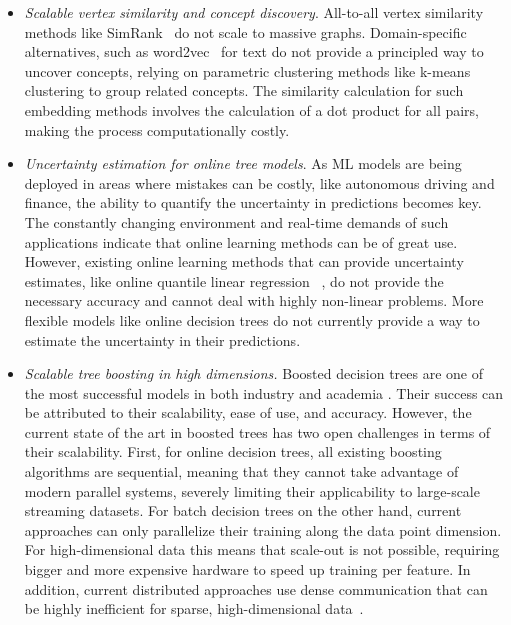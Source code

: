 \begin{itemize}
	\item \emph{Scalable vertex similarity and concept discovery}. All-to-all vertex similarity
	methods like SimRank~\cite{simrank} do not scale to massive graphs. Domain-specific alternatives,
	such as word2vec~\cite{word2vec} for text do not provide a principled way to uncover
	concepts, relying on parametric clustering methods like k-means clustering to group related
	concepts. The similarity calculation for such embedding methods involves the
	calculation of a dot product for all pairs, making the process
	computationally costly.

	\item \emph{Uncertainty estimation for online tree models}. As ML models are being
	deployed in areas where mistakes can be costly, like autonomous driving and finance,
	the ability to quantify the uncertainty in predictions becomes key. The constantly
	changing environment and real-time demands of such applications indicate that
	online learning methods can be of great use. However, existing online learning
	methods that can provide uncertainty estimates, like online quantile linear regression
	~\cite{koenker2005qr}, do not provide the necessary accuracy and cannot deal
	with highly non-linear problems. More flexible models like online decision trees
	do not currently provide a way to estimate the uncertainty in their predictions.

	\item \emph{Scalable tree boosting in high dimensions.} Boosted
	decision trees are one of the most successful models in both industry and academia
	\cite{xgboost, ctr-facebook, mcrank}.
	Their success can be attributed to their scalability, ease of use, and accuracy.
	However, the current state of the art in boosted trees has two open challenges
	in terms of their scalability.
	First, for online decision trees, all existing boosting algorithms are sequential,
	meaning that they cannot take advantage of modern parallel systems, severely limiting
	their applicability to large-scale streaming datasets. For batch decision trees on the other
	hand, current approaches can only parallelize their training along the data point
	dimension. For high-dimensional data this means that scale-out is not possible,
	requiring bigger and more expensive hardware to speed up training per feature.
	In addition, current distributed approaches use dense communication that can
	be highly inefficient for sparse, high-dimensional data~\cite{xgboost, lightgbm}.
\end{itemize}

